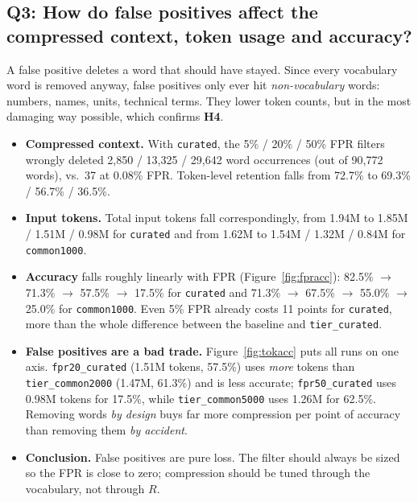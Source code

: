 \documentclass[11pt]{article}
\newcommand{\code}[1]{\texttt{#1}}
\begin{document}
\subsection{Q3: How do false positives affect the compressed context, token usage and accuracy?}
A false positive deletes a word that should have stayed. Since every vocabulary word is removed
anyway, false positives only ever hit \emph{non-vocabulary} words: numbers, names, units, technical
terms. They lower token counts, but in the most damaging way possible, which confirms \textbf{H4}.
\begin{itemize}
  \item \textbf{Compressed context.} With \code{curated}, the 5\% / 20\% / 50\% FPR filters
        wrongly deleted 2{,}850 / 13{,}325 / 29{,}642 word occurrences (out of 90{,}772 words), vs.\ 37
        at 0.08\% FPR. Token-level retention falls from 72.7\% to 69.3\% / 56.7\% / 36.5\%.
  \item \textbf{Input tokens.} Total input tokens fall correspondingly, from 1.94M to 1.85M / 1.51M /
        0.98M for \code{curated} and from 1.62M to 1.54M / 1.32M / 0.84M for \code{common1000}.
  \item \textbf{Accuracy} falls roughly linearly with FPR (Figure~\ref{fig:fpracc}): 82.5\% $\to$
        71.3\% $\to$ 57.5\% $\to$ 17.5\% for \code{curated} and 71.3\% $\to$ 67.5\% $\to$ 55.0\% $\to$
        25.0\% for \code{common1000}. Even 5\% FPR already costs 11 points for \code{curated}, more than
        the whole difference between the baseline and \code{tier\_curated}.
  \item \textbf{False positives are a bad trade.} Figure~\ref{fig:tokacc} puts all runs on one
        axis. \code{fpr20\_curated} (1.51M tokens, 57.5\%) uses \emph{more} tokens than
        \code{tier\_common2000} (1.47M, 61.3\%) and is less accurate; \code{fpr50\_curated} uses 0.98M
        tokens for 17.5\%, while \code{tier\_common5000} uses 1.26M for 62.5\%. Removing words
        \emph{by design} buys far more compression per point of accuracy than removing them
        \emph{by accident}.
  \item \textbf{Conclusion.} False positives are pure loss. The filter should always be sized so the
        FPR is close to zero; compression should be tuned through the vocabulary, not through $R$.
\end{itemize}

\end{document}
